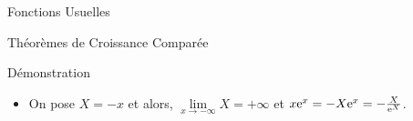 \documentclass{cours}
\begin{document}
\begin{Gpartie}{Fonctions Usuelles}
\begin{Spartie}{Théorèmes de Croissance Comparée}
\begin{SSpartie}{Démonstration}
\begin{itemize}
                    Soit $f$ définie sur $\big]0\,;+\infty\big[$ par $f(x)=\me^x-\frac{x^2}{2}$. Étudions les variations de $f$.

                    $f'(x)=\me^x-x$ on ne conclut pas directement sur le signe. Dérivons encore :

                    $f''(x)=\me^x-1\quad\text{et}\quad \me^x-1>0\iff \me^x>1\iff x>0$

                    Donc, $f''(x)$ est strictement positive pour $x>0$.

                    Ainsi on a $f'(x)$ strictement croissante sur $\big]0\,;+\infty\big[$ et comme $f'(0)=1>0$, $f'$ est strictement positive sur $\big]0\,;+\infty\big[$ :
                    \begin{center}                        
                        \vspace*{2ex}
                        \parbox{\linewidth}{}
                        \vspace*{2ex}
                    \end{center}
                    Donc, pour tout $x\in\big]0\,;+\infty\big[,~\me^x-\frac{x^2}{2}>0$ et donc $\me^x>\frac{x^2}{2}$. \\ Comme $x>0$ on peut diviser par $x$ : \\ Donc, $\frac{\me^x}{x}>\frac{x}{2}$ et comme $\lim\limits_{x\to+\infty}\frac{x}{2}=+\infty$, par comparaison : \[\lim\limits_{x\to+\infty}\frac{\me^x}{x}=+\infty\quad\square\]
                    \item On pose $X=-x$ et alors, $\lim\limits_{x\to-\infty}X=+\infty$ et $x\mathrm{e}^x=-X\mathrm{e}^{x}=-\frac{X}{\mathrm{e}^X}$.
                    

\end{itemize}
\end{SSpartie}
\end{Spartie}
\end{Gpartie}
\end{document}
